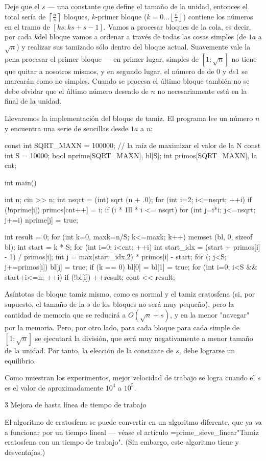 Deje que el $s$ --- una constante que define el tamaño de la unidad, entonces el total sería de $\left\lceil \frac{n}{s} \right\rceil$ bloques, $k$-primer bloque ($k = 0 \ldots \left\lfloor \frac{n}{s} \right\rfloor$) contiene los números en el tramo de $[ks; ks+s-1]$. Vamos a procesar bloques de la cola, es decir, por cada $k$del bloque vamos a ordenar a través de todas las cosas simples (de $1 a$ a $\sqrt{n}$) y realizar sus tamizado sólo dentro del bloque actual. Suavemente vale la pena procesar el primer bloque --- en primer lugar, simples de $[1; \sqrt{n}]$ no tiene que quitar a nosotros mismos, y en segundo lugar, el número de de $0$ y $de 1$ se marcarán como no simples. Cuando se procesa el último bloque también no se debe olvidar que el último número deseado de $n$ no necesariamente está en la final de la unidad.

Llevaremos la implementación del bloque de tamiz. El programa lee un número $n$ y encuentra una serie de sencillas desde $1 a$ a $n$:

\code
const int SQRT_MAXN = 100000; // la raíz de maximizar el valor de la N
const int S = 10000;
bool nprime[SQRT_MAXN], bl[S];
int primos[SQRT_MAXN], la cnt;

int main() {

int n;
cin >> n;
int nsqrt = (int) sqrt (n + .0);
for (int i=2; i<=nsqrt; ++i)
if (!nprime[i]) {
primos[cnt++] = i;
if (i * 1ll * i <= nsqrt)
for (int j=i*i; j<=nsqrt; j+=i)
nprime[j] = true;
}

int result = 0;
for (int k=0, maxk=n/S; k<=maxk; k++) {
memset (bl, 0, sizeof bl);
int start = k * S;
for (int i=0; i<cnt; ++i) {
int start_idx = (start + primos[i] - 1) / primos[i];
int j = max(start_idx,2) * primos[i] - start;
for (; j<S; j+=primos[i])
bl[j] = true;
}
if (k == 0)
bl[0] = bl[1] = true;
for (int i=0; i<S && start+i<=n; ++i)
if (!bl[i])
++result;
}
cout << result;

}
\endcode

Asíntotas de bloque tamiz mismo, como es normal y el tamiz eratosfena (si, por supuesto, el tamaño de la $s$ de los bloques no será muy pequeño), pero la cantidad de memoria que se reducirá a $O(\sqrt{n} + s)$, y en la menor "navegar" por la memoria. Pero, por otro lado, para cada bloque para cada simple de $[1; \sqrt{n}]$ se ejecutará la división, que será muy negativamente a menor tamaño de la unidad. Por tanto, la elección de la constante de $s$, debe lograrse un equilibrio.

Como muestran los experimentos, mejor velocidad de trabajo se logra cuando el $s$ es el valor de aproximadamente $10^4$ a $10^5$.


\h3{ Mejora de hasta línea de tiempo de trabajo }

El algoritmo de eratosfena se puede convertir en un algoritmo diferente, que ya va a funcionar por un tiempo lineal --- véase el artículo \algohref=prime_sieve_linear{"Tamiz eratosfena con un tiempo de trabajo"}. (Sin embargo, este algoritmo tiene y desventajas.)